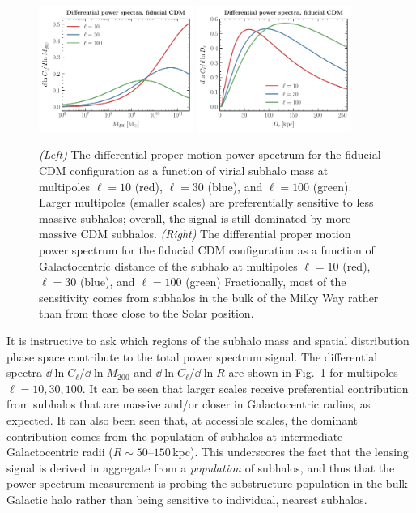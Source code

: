 \documentclass[prd,aps,twocolumn,nofootinbib,superscriptaddress,preprintnumbers,balancelastpage,longbibliography,floatfix]{revtex4-1}
\begin{document}
\begin{figure}[!htbp]
\centering
\includegraphics[width=0.45\textwidth]{plots/dlnCldlnM200.pdf}
\includegraphics[width=0.45\textwidth]{plots/dlnCldlnR.pdf}
\caption{\emph{(Left)} The differential proper motion power spectrum for the fiducial CDM configuration as a function of virial subhalo mass at multipoles $\ell=10$ (red), $\ell=30$ (blue), and $\ell=100$ (green). Larger multipoles (smaller scales) are preferentially sensitive to less massive subhalos; overall, the signal is still dominated by more massive CDM subhalos. \emph{(Right)} The differential proper motion power spectrum for the fiducial CDM configuration as a function of Galactocentric distance of the subhalo  at multipoles $\ell=10$ (red), $\ell=30$ (blue), and $\ell=100$ (green) Fractionally, most of the sensitivity comes from subhalos in the bulk of the Milky Way rather than from those close to the Solar position. } \label{fig:pspec_differential}
\end{figure}

It is instructive to ask which regions of the subhalo mass and spatial distribution phase space contribute to the total power spectrum signal. The differential spectra $\dd\ln C_\ell/\dd\ln M_{200}$ and $\dd\ln C_\ell/\dd\ln R$ are shown in Fig.~\ref{fig:pspec_differential} for multipoles $\ell=10, 30, 100$. It can be seen that larger scales receive preferential contribution from subhalos that are massive and/or closer in Galactocentric radius, as  expected. It can also been seen that, at accessible scales, the dominant contribution comes from the population of subhalos at intermediate Galactocentric radii ($R\sim50$--$150$\,kpc). This underscores the fact that the lensing signal is derived in aggregate from a \emph{population} of subhalos, and thus that the power spectrum measurement is probing the substructure population in the bulk Galactic halo rather than being sensitive to individual, nearest subhalos.
\end{document}
